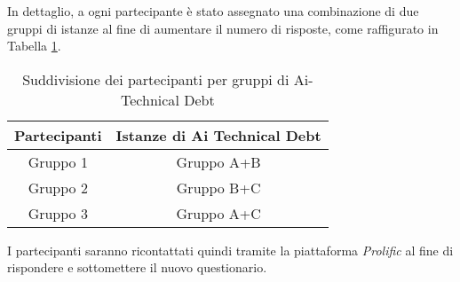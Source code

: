 In dettaglio, a ogni partecipante è stato assegnato una combinazione di due gruppi di istanze al fine di aumentare il numero di risposte, come raffigurato in Tabella \ref{tab:design_experiment}.

\begin{table}[h]
    \centering
    \begin{tabular}{|c|c|}
        \hline
        \textbf{Partecipanti} & \textbf{Istanze di Ai Technical Debt}  \\
        \hline
        Gruppo 1 & Gruppo A+B \\
        Gruppo 2 & Gruppo B+C \\
        Gruppo 3 & Gruppo A+C \\
        \hline
    \end{tabular}
    \caption{Suddivisione dei partecipanti per gruppi di Ai-Technical Debt}
    \label{tab:design_experiment}
\end{table}

I partecipanti saranno ricontattati quindi tramite la piattaforma \textit{Prolific} al fine di rispondere e sottomettere il nuovo questionario.

